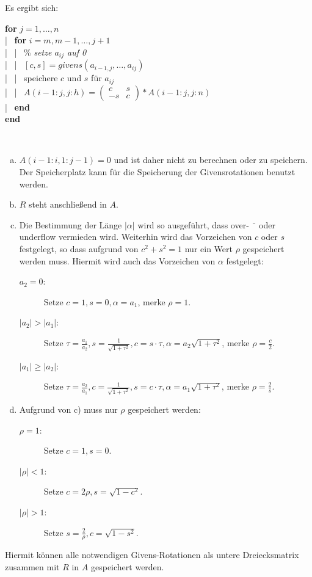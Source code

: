 Es ergibt sich:

 

\begin{pseudocode}{0.7\linewidth}
	\textbf{for} $j=1, \dotsc , n$ \\
	|~	\>	\textbf{for} $i=m, m-1, \dotsc , j+1$ \\
	|~	\>		|~	\>\% \textit{setze $a_{ij}$ auf 0} \\
	|~	\>		|~	\>$[c,s] = givens(a_{i-1,j}, \dotsc, a_{ij}) $\\
	|~	\>		|~	\>speichere $c$ und $s$ für $a_{ij}$ \\
	|~	\>		|~	\>$A(i-1:j, j:h) =\left( \begin{smallmatrix}c & s\\ -s & c	\end{smallmatrix}\right) * A(i-1:j, j:n)$ \\
	|~	\> \textbf{end}\\
	\textbf{end}							
\end{pseudocode}

\begin{Beme}~
	\begin{enumerate}[a)]
		\item $A(i-1 : i, 1 : j-1) = 0$ und ist daher nicht zu berechnen oder
		zu speichern. Der Speicherplatz kann für die Speicherung der
		Givensrotationen benutzt werden.
		\item  $R$ steht anschließend in $A$.
		\item Die Bestimmung der Länge $|\alpha|$ wird so ausgeführt, dass over- ¨
		oder underflow vermieden wird. Weiterhin wird das Vorzeichen
		von $c$ oder $s$ festgelegt, so dass aufgrund von $c^2+s^2=1$ nur
		ein Wert $\rho$ gespeichert werden muss. Hiermit wird auch das
		Vorzeichen von $\alpha$ festgelegt:\\
		\begin{description}
			\item[$a_2=0$:] Setze $c=1, s=0, \alpha = a_1$, merke $\rho=1$.
			\item[$|a_2|>|a_1|$:] Setze $\tau= \frac{a_1}{a_2}, s=\frac{1}{\sqrt{1+\tau^2}}, c=s\cdot\tau, \alpha =a_2\sqrt{1+\tau^2}$, merke $\rho=\frac{c}{2}$.
			\item[$|a_1|\geq|a_2|$:] Setze $\tau= \frac{a_2}{a_1}, c=\frac{1}{\sqrt{1+\tau^2}}, s=c\cdot\tau, \alpha =a_1\sqrt{1+\tau^2}$, merke $\rho=\frac{2}{s}$.
		\end{description}
		\item Aufgrund von c) muss nur $\rho$ gespeichert werden:
		\begin{description}
			\item[$\rho=1$:] Setze $c=1, s=0$.
			\item[$|\rho|<1$:] Setze $c=2\rho , s= \sqrt{1-c^2}$.
			\item[$|\rho|>1$:] Setze $s=\frac{2}{\rho}, c=\sqrt{1-s^2}$.
		\end{description}
	\end{enumerate}
	Hiermit können alle notwendigen Givens-Rotationen als untere
	Dreiecksmatrix zusammen mit $R$ in $A$ gespeichert werden.
\end{Beme}



